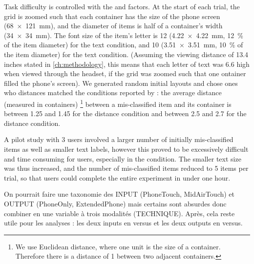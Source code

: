 Task difficulty is controlled with the  and  factors. At the start of each trial, the grid is zoomed such that each container has the size of the phone screen (\SI{68x121}{\mm}), and the diameter of items is half of a container's width (\SI{34x34}{\mm}). The font size of the item's letter is \SI{12}{\pt} (\SI{4.22x4.22}{\mm}, \SI{12}{\percent} of the item diameter) for the  text condition, and \SI{10}{\pt} (\SI{3.51x3.51}{\mm}, \SI{10}{\percent} of the item diameter) for the  text condition. (Assuming the viewing distance of 13.4 inches stated in \autoref{ch:methodology}, this means that each letter of  text was \SI{6.6}{\px} high when viewed through the headset, if the grid was zoomed such that one ontainer filled the phone's screen). We generated random initial layouts and chose ones who distances matched the conditions reported by \cite{Liu2014}: the average distance (measured in containers) \footnote{We use Euclidean distance, where one unit is the size of a container. Therefore there is a distance of 1 between two adjacent containers.} %
between a mis-classified item and its container is between 1.25 and 1.45 for the  distance condition and between 2.5 and 2.7 for the  distance condition.

A pilot study with 3 users involved a larger number of initially mis-classified items as well as smaller text labels, however this proved to be excessively difficult and time consuming for users, especially in the  condition. The smaller text size was thus increased, and the number of mis-classified items reduced to 5 items per trial, so that users could complete the entire experiment in under one hour. %

On pourrait faire une taxonomie des INPUT (PhoneTouch, MidAirTouch) et OUTPUT (PhoneOnly, ExtendedPhone) mais certains sont absurdes donc combiner en une variable à trois modalités (TECHNIQUE). Après, cela reste utile pour les analyses : les deux inputs en versus et les deux outputs en versus.

